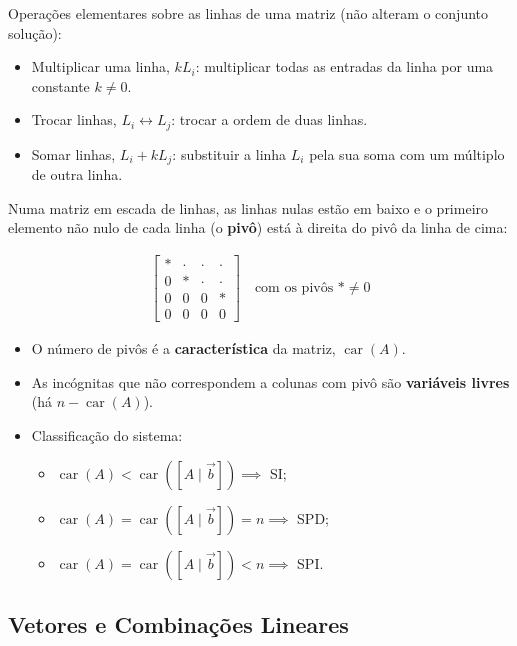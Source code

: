 \documentclass{article}
\begin{document}
\smallskip

Operações elementares sobre as linhas de uma matriz (não alteram o conjunto solução):

\begin{itemize}
    \item Multiplicar uma linha, $k L_i$: multiplicar todas as entradas da linha por uma constante $k \neq 0$.
    \item Trocar linhas, $L_i \leftrightarrow L_j$: trocar a ordem de duas linhas.
    \item Somar linhas, $L_i + k L_j$: substituir a linha $L_i$ pela sua soma com um múltiplo de outra linha.
\end{itemize}

Numa matriz em escada de linhas, as linhas nulas estão em baixo e o primeiro elemento não nulo de cada linha
(o \textbf{pivô}) está à direita do pivô da linha de cima:

\begin{gather*}
\begin{bmatrix}
\ast & \cdot & \cdot & \cdot \\
0 & \ast & \cdot & \cdot \\
0 & 0 & 0 & \ast \\
0 & 0 & 0 & 0
\end{bmatrix}
\quad \text{com os pivôs } \ast \neq 0
\end{gather*}

\begin{itemize}
    \item O número de pivôs é a \textbf{característica} da matriz, $\operatorname{car}(A)$.
    \item As incógnitas que não correspondem a colunas com pivô são \textbf{variáveis livres}
    (há $n - \operatorname{car}(A)$).
    \item Classificação do sistema:
    \begin{itemize}
        \item $\operatorname{car}(A) < \operatorname{car}([A \mid \vec{b}]) \implies$ SI;
        \item $\operatorname{car}(A) = \operatorname{car}([A \mid \vec{b}]) = n \implies$ SPD;
        \item $\operatorname{car}(A) = \operatorname{car}([A \mid \vec{b}]) < n \implies$ SPI.
    \end{itemize}
\end{itemize}

\bigskip

\subsection{Vetores e Combinações Lineares}
\end{document}
